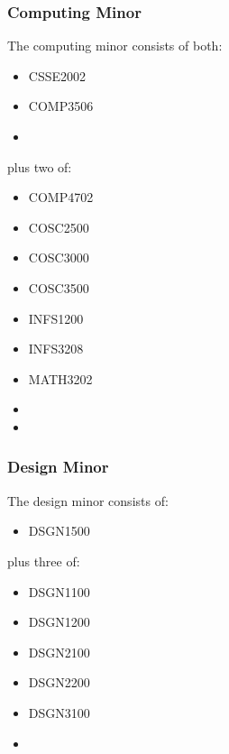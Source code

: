 \documentclass[a4paper,12pt]{report}
\begin{document}
\subsubsection{Computing Minor}
The computing minor consists of both:
\begin{multicols}{3}
    \begin{itemize}
        \item CSSE2002
        \item COMP3506
        \item[]
    \end{itemize}
\end{multicols}
plus two of:
\begin{multicols}{3}
    \begin{itemize}
        \item COMP4702
        \item COSC2500
        \item COSC3000
        \item COSC3500
        \item INFS1200
        \item INFS3208
        \item MATH3202
        \item[]
        \item[]
    \end{itemize}
\end{multicols}

\subsubsection{Design Minor}
The design minor consists of:
\begin{itemize}
    \item DSGN1500
\end{itemize}
plus three of:
\begin{multicols}{3}
    \begin{itemize}
        \item DSGN1100
        \item DSGN1200
        \item DSGN2100
        \item DSGN2200
        \item DSGN3100
        \item[]
    \end{itemize}
\end{multicols}
\end{document}
